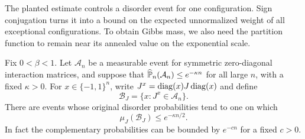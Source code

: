The planted estimate controls a disorder event for one configuration.
Sign conjugation turns it into a bound on the expected unnormalized
weight of all exceptional configurations.  To obtain Gibbs mass, we
also need the partition function to remain near its annealed value
on the exponential scale.

\begin{lemma}
 \label{rcut:lem:annealed-transfer}
 Fix $0<\beta<1$.  Let $\mathcal A_n$ be a measurable event for
 symmetric zero-diagonal interaction matrices, and suppose that
 $\widehat\P_n(\mathcal A_n)\le e^{-\kappa n}$ for all large $n$,
 with a fixed $\kappa>0$.
 For $x\in\{-1,1\}^n$, write
 $J^x=\diag(x)J\diag(x)$ and define
 \[
  \mathcal B_J=\{x:J^x\in\mathcal A_n\}.
 \]
 There are events whose original disorder probabilities tend to one
 on which
 \begin{equation}
  \mu_J(\mathcal B_J)\le e^{-\kappa n/2}.
  \label{rcut:eq:comp-gibbs-small}
 \end{equation}
 In fact the complementary probabilities can be bounded by
 $e^{-c n}$ for a fixed $c>0$.
\end{lemma}


